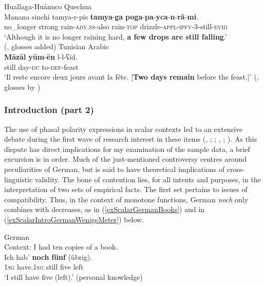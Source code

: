 \begin{exe}
	\ex Huallaga-Huánuco Quechua\label{exScalarIntroQuechua}\\
	\gll Manana sinchi	tamya-r-pis \textbf{tamya}-\textbf{ga}	\textbf{poga}-\textbf{pa}-\textbf{yca}-\textbf{n}-\textbf{rä}-\textbf{mi}.\\
	no\_longer strong rain-\textsc{adv}.\textsc{ss}-also rain-\textsc{top} drizzle-\textsc{appl}-\textsc{ipfv}-3-still-\textsc{evid}\\
	\glt \lq Although it is no longer raining hard, \textbf{a few drops are still falling}.\rq
	\\ (\cite[420]{WeberEtAl2008}, glosses added)
	\ex Tunisian Arabic\label{exScalarIntroTunisianDays}\\
	\gll \textbf{Māzāl} \textbf{yūm}-\textbf{ēn}  l-l-ʕīd.\\
	still day-\textsc{du}  to-\textsc{def}-feast\\
	\glt \lq Il reste encore deux jours avant la fête. [\textbf{Two days remain} before the feast.]\rq{ }(\cite[1736]{MarcaisGuiga19581961}, glosses by \cite{FischerEtAlTunisian})	
\end{exe}


\subsubsection{Introduction (part 2)} 
The use of phasal polarity expressions in scalar contexts led to an extensive debate during the first wave of research interest in these items (\cite{vanderAuwera1991BeyondDuality}, \citeyear{vanderAuwera1993}; \cite{Garrido1992}; \cite{Loebner1989}, \citeyear{Loebner1999}; \cite{Mittwoch1993}). As this dispute has direct implications for my examination of the sample data, a brief excursion is in order. Much of the just-mentioned controversy centres around peculiarities of German, but is said to have theoretical implications of cross-linguistic validity. The bone of contention lies, for all intents and purposes, in the interpretation of two sets of empirical facts. The first set pertains to issues of compatibility. Thus, in the context of monotone functions, German \textit{noch} only combines with decreases, as in (\ref{exScalarGermanBooks}) and in (\ref{exScalarIntroGermanWenigeMeter}) below.

\begin{exe}
	\ex German\label{exScalarGermanBooks}\\
	 Context: I had ten copies of a book.\\
	\gll Ich hab' \textbf{noch} \textbf{fünf} \textup{(}übrig\textup{)}. \\
	1\textsc{sg} have.1\textsc{sg} still five \phantom{(}left\\
	\glt \lq I still have five (left).' (personal knowledge)
\end{exe}

